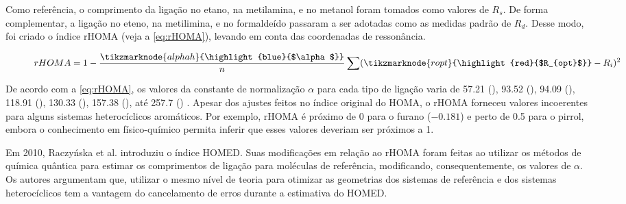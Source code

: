 Como referência, o comprimento da ligação  no etano,  na metilamina, e  no metanol foram tomados como valores de $R_s$. De forma complementar, a ligação  no eteno,  na metilimina, e  no formaldeído passaram a ser adotadas como as medidas padrão de $R_d$. Desse modo, foi criado o índice \gls{rHOMA} (veja a \autoref{eq:rHOMA}), levando em conta das coordenadas de ressonância.


\begin{figure}[htb]
    \vspace{2\baselineskip}
\begin{equation}
    \label{eq:rHOMA}
    rHOMA = 1 - \frac{\tikzmarknode{alphah}{\highlight{blue}{$\alpha$}}}{n} \sum (\tikzmarknode{ropt}{\highlight{red}{$R_{opt}$}} - R_i)^2
\end{equation}
\vspace{2\baselineskip}
\end{figure}

De acordo com a \autoref{eq:rHOMA}, os valores da constante de normalização $\alpha$ para cada tipo de ligação varia de 57.21 (), 93.52 (), 94.09 (), 118.91 (), 130.33 (), 157.38 (), até 257.7 () \autocite{Krygowski2000, krygowski2001}. Apesar dos ajustes feitos no índice original do \gls{HOMA}, o \gls{rHOMA} forneceu valores incoerentes para alguns sistemas heterocíclicos aromáticos. Por exemplo, \gls{rHOMA} é próximo de 0 para o furano ($-0.181$) e perto de 0.5 para o pirrol, embora o conhecimento em físico-químico permita inferir que esses valores deveriam ser próximos a 1.

Em 2010, Raczyńska et al.\autocite{Raczyska2010} introduziu o índice \gls{HOMED}. Suas modificações em relação ao \gls{rHOMA} foram feitas ao utilizar os métodos de química quântica para estimar os comprimentos de ligação para moléculas de referência, modificando, consequentemente, os valores de $\alpha$. Os autores argumentam que, utilizar o mesmo nível de teoria para otimizar as geometrias dos sistemas de referência e dos sistemas heterocíclicos tem a vantagem do cancelamento de erros durante a estimativa do \gls{HOMED}.

